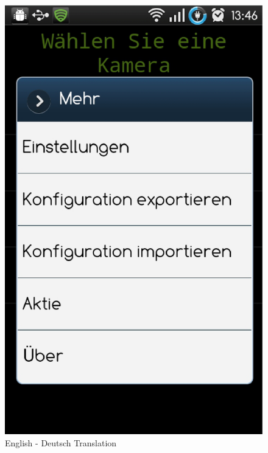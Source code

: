 \begin{figure}[H]
   \includegraphics[scale=0.4]{Images/de.eps}
  \caption{English - Deutsch Translation}
\end{figure}  


